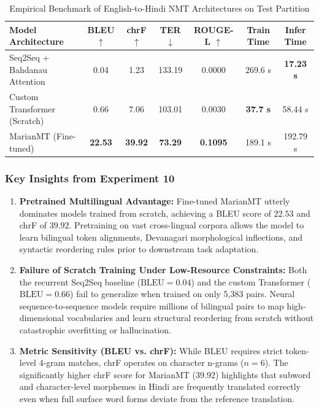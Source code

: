 \begin{table}[H]
\centering
\caption{Empirical Benchmark of English-to-Hindi NMT Architectures on Test Partition}
\label{tab:exp10_benchmark_results}
\begin{tabular}{lcccccc}
\toprule
\textbf{Model Architecture} & \textbf{BLEU} $\uparrow$ & \textbf{chrF} $\uparrow$ & \textbf{TER} $\downarrow$ & \textbf{ROUGE-L} $\uparrow$ & \textbf{Train Time} & \textbf{Infer Time} \\
\midrule
Seq2Seq + Bahdanau Attention & 0.04 & 1.23 & 133.19 & 0.0000 & 269.6 s & \textbf{17.23 s} \\
Custom Transformer (Scratch) & 0.66 & 7.06 & 103.01 & 0.0030 & \textbf{37.7 s} & 58.44 s \\
MarianMT (Fine-tuned) & \textbf{22.53} & \textbf{39.92} & \textbf{73.29} & \textbf{0.1095} & 189.1 s & 192.79 s \\
\bottomrule
\end{tabular}
\end{table}

\subsubsection{Key Insights from Experiment 10}
\begin{enumerate}
    \item \textbf{Pretrained Multilingual Advantage:} Fine-tuned MarianMT utterly dominates models trained from scratch, achieving a BLEU score of $\mathbf{22.53}$ and chrF of $\mathbf{39.92}$. Pretraining on vast cross-lingual corpora allows the model to learn bilingual token alignments, Devanagari morphological inflections, and syntactic reordering rules prior to downstream task adaptation.
    \item \textbf{Failure of Scratch Training Under Low-Resource Constraints:} Both the recurrent Seq2Seq baseline ($\text{BLEU} = 0.04$) and the custom Transformer ($\text{BLEU} = 0.66$) fail to generalize when trained on only 5,383 pairs. Neural sequence-to-sequence models require millions of bilingual pairs to map high-dimensional vocabularies and learn structural reordering from scratch without catastrophic overfitting or hallucination.
    \item \textbf{Metric Sensitivity (BLEU vs. chrF):} While BLEU requires strict token-level 4-gram matches, chrF operates on character n-grams ($n=6$). The significantly higher chrF score for MarianMT ($39.92$) highlights that subword and character-level morphemes in Hindi are frequently translated correctly even when full surface word forms deviate from the reference translation.
\end{enumerate}

